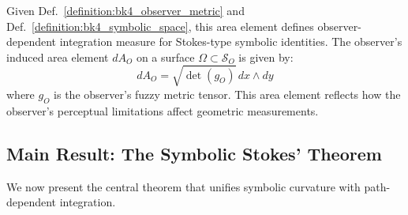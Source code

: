 \begin{definition}
\label{definition:bk4_induced_area}
Given Def.~\ref{definition:bk4_observer_metric} and Def.~\ref{definition:bk4_symbolic_space}, this area element defines observer-dependent integration measure for Stokes-type symbolic identities.
The observer's induced area element $dA_O$ on a surface $\Omega \subset \mathcal{S}_O$ is given by:
\[
dA_O = \sqrt{\det(g_O)} \, dx \wedge dy
\]
where $g_O$ is the observer's fuzzy metric tensor. This area element reflects how the observer's perceptual limitations affect geometric measurements.
\end{definition}

\subsection{Main Result: The Symbolic Stokes' Theorem}
\label{subsec:bk4_main_result_stokes}

We now present the central theorem that unifies symbolic curvature with path-dependent integration.

